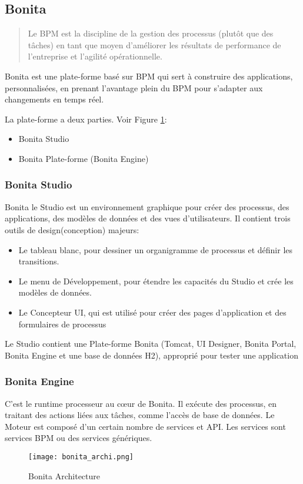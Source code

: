\subsection{Bonita}
\begin{quotation}
Le BPM est la discipline de la gestion des processus (plutôt que des tâches) en tant que moyen d'améliorer les résultats de performance de l'entreprise et l'agilité opérationnelle. \cite{gartner_glossary}
\end{quotation}

Bonita est une plate-forme basé sur BPM qui sert à construire des applications, personnalisées, en prenant l'avantage plein du BPM pour s'adapter aux changements en temps réel.

La plate-forme a deux parties. Voir Figure \ref{fig:bonita_archi}:
\begin{itemize}
  \item Bonita Studio
  \item Bonita Plate-forme (Bonita Engine)
\end{itemize}

\subsubsection{Bonita Studio}
Bonita le Studio est un environnement graphique pour créer des processus, des applications, des modèles de données et des vues d'utilisateurs. Il contient trois outils de design(conception) majeurs:

\begin{itemize}
  \item Le tableau blanc, pour dessiner un organigramme de processus et définir les transitions.
  \item Le menu de Développement, pour étendre les capacités du Studio et crée les modèles de données.
  \item Le Concepteur UI, qui est utilisé pour créer des pages d'application et des formulaires de processus
\end{itemize}

Le Studio contient une Plate-forme Bonita (Tomcat, UI Designer, Bonita Portal, Bonita Engine et une base de données H2), approprié pour tester une application

\subsubsection{Bonita Engine}
C'est le runtime processeur au cœur de Bonita. Il exécute des processus, en traitant des actions liées aux tâches, comme l'accès de base de données. Le Moteur est composé d'un certain nombre de services et API. Les services sont services BPM ou des services génériques.

\begin{figure}[!ht]
\centering
\texttt{[image: bonita\_archi.png]}
\caption{Bonita Architecture}
\label{fig:bonita_archi}
\end{figure}
